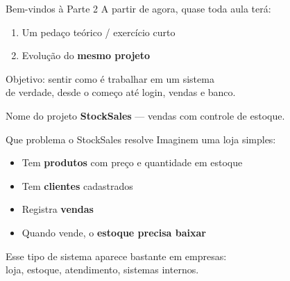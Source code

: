 \documentclass[aspectratio=169,11pt]{beamer}
\begin{document}
\begin{frame}{Bem-vindos à Parte 2}
  A partir de agora, quase toda aula terá:

  \vspace{0.6em}
  \begin{enumerate}
    \item Um pedaço teórico / exercício curto
    \item Evolução do \textbf{mesmo projeto}
  \end{enumerate}

  \vspace{0.8em}
  Objetivo: sentir como é trabalhar em um sistema\\
  de verdade, desde o começo até login, vendas e banco.

  \vspace{0.6em}
  \begin{alertblock}{Nome do projeto}
    \textbf{StockSales} --- vendas com controle de estoque.
  \end{alertblock}
\end{frame}

\begin{frame}{Que problema o StockSales resolve}
  Imaginem uma loja simples:

  \vspace{0.5em}
  \begin{itemize}
    \item Tem \textbf{produtos} com preço e quantidade em estoque
    \item Tem \textbf{clientes} cadastrados
    \item Registra \textbf{vendas}
    \item Quando vende, o \textbf{estoque precisa baixar}
  \end{itemize}

  \vspace{0.7em}
  Esse tipo de sistema aparece bastante em empresas:\\
  loja, estoque, atendimento, sistemas internos.
\end{frame}
\end{document}
